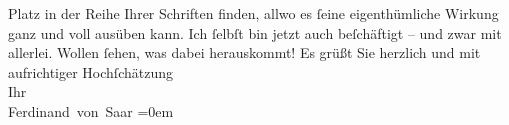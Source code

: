 \begin{ledgroupsized}[t]{13cm}
                    Platz in der Reihe Ihrer Schriften finden, allwo es ſeine eigenthümliche Wirkung
                    ganz und voll ausüben kann.\pend
           \pstart
           Ich ſelbſt bin jetzt auch beſchäftigt – und zwar mit allerlei. Wollen ſehen, was
                    dabei herauskommt!\pend
           \pstart
           Es grüßt Sie herzlich und mit aufrichtiger
                        Hochſchätzung{\\[\baselineskip]}Ihr{\\[\baselineskip]}\spacefill\mbox{Ferdinand von Saar}\pend
           \leftskip=0em{}          \endnumbering{}\end{ledgroupsized}  \newcommand{\dateiname}{L00410}\newcommand{\titel}{Ferdinand von Saar an Arthur Schnitzler, 13. 12. 1894}\newcommand{\editorInnen}{Martin Anton Müller und Gerd-Hermann Susen}
      